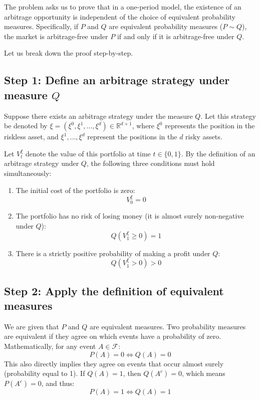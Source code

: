 The problem asks us to prove that in a one-period model, the existence of an arbitrage opportunity is independent of the choice of equivalent probability measures. Specifically, if $P$ and $Q$ are equivalent probability measures ($P \sim Q$), the market is arbitrage-free under $P$ if and only if it is arbitrage-free under $Q$.

Let us break down the proof step-by-step.

\subsection*{Step 1: Define an arbitrage strategy under measure $Q$}
Suppose there exists an arbitrage strategy under the measure $Q$. Let this strategy be denoted by $\xi = (\xi^{0}, \xi^{1}, \dots, \xi^{d}) \in \mathbb{R}^{d+1}$, where $\xi^{0}$ represents the position in the riskless asset, and $\xi^{1}, \dots, \xi^{d}$ represent the positions in the $d$ risky assets.

Let $V^{\xi}_t$ denote the value of this portfolio at time $t \in \{0, 1\}$. By the definition of an arbitrage strategy under $Q$, the following three conditions must hold simultaneously:
\begin{enumerate}
    \item The initial cost of the portfolio is zero:
    \begin{equation}
        V_{0}^{\xi} = 0
    \end{equation}
    \item The portfolio has no risk of losing money (it is almost surely non-negative under $Q$):
    \begin{equation}
        Q(V_{1}^{\xi} \ge 0) = 1
    \end{equation}
    \item There is a strictly positive probability of making a profit under $Q$:
    \begin{equation}
        Q(V_{1}^{\xi} > 0) > 0
    \end{equation}
\end{enumerate}

\subsection*{Step 2: Apply the definition of equivalent measures}
We are given that $P$ and $Q$ are equivalent measures. Two probability measures are equivalent if they agree on which events have a probability of zero. Mathematically, for any event $A \in \mathcal{F}$:
\begin{equation}
    P(A) = 0 \iff Q(A) = 0
\end{equation}
This also directly implies they agree on events that occur almost surely (probability equal to 1). If $Q(A) = 1$, then $Q(A^c) = 0$, which means $P(A^c) = 0$, and thus:
\begin{equation}
    P(A) = 1 \iff Q(A) = 1
\end{equation}

